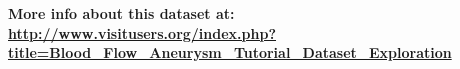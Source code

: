 \begin{frame}
\pause
\begin{columns}
\begin{column}{12cm}
\vspace{-.5mm}
{\tiny\bf
More info about this dataset at: \\
\vspace{-2.5mm}
\url{http://www.visitusers.org/index.php?title=Blood_Flow_Aneurysm_Tutorial_Dataset_Exploration}
}
\end{column}
\end{columns}
\end{frame}
\resetEnv
\basicEnv
